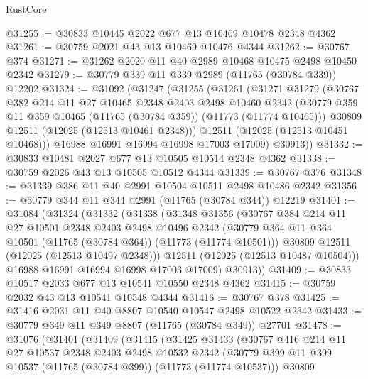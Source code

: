 \begin{lexlean}{RustCore}
\begin{coremodule}
@31255 := @30833 @10445 @2022 @677 @13 @10469 @10478 @2348 @4362
@31261 := @30759 @2021 @43 @13 @10469 @10476 @4344
@31262 := @30767 @374
@31271 := @31262 @2020 @11 @40 @2989 @10468 @10475 @2498 @10450 @2342
@31279 := @30779 @339 @11 @339 @2989 (@11765 (@30784 @339)) @12202
@31324 := @31092
    (@31247
      (@31255
        (@31261
          (@31271
            @31279
            (@30767
              @382
              @214
              @11
              @27
              @10465
              @2348
              @2403
              @2498
              @10460
              @2342
              (@30779 @359 @11 @359 @10465 (@11765 (@30784 @359)) (@11773 (@11774 @10465)))
              @30809
              @12511
              (@12025 (@12513 @10461 @2348)))
            @12511
            (@12025 (@12513 @10451 @10468)))
          @16988
          @16991
          @16994
          @16998
          @17003
          @17009)
        @30913))
@31332 := @30833 @10481 @2027 @677 @13 @10505 @10514 @2348 @4362
@31338 := @30759 @2026 @43 @13 @10505 @10512 @4344
@31339 := @30767 @376
@31348 := @31339 @386 @11 @40 @2991 @10504 @10511 @2498 @10486 @2342
@31356 := @30779 @344 @11 @344 @2991 (@11765 (@30784 @344)) @12219
@31401 := @31084
    (@31324
      (@31332
        (@31338
          (@31348
            @31356
            (@30767
              @384
              @214
              @11
              @27
              @10501
              @2348
              @2403
              @2498
              @10496
              @2342
              (@30779 @364 @11 @364 @10501 (@11765 (@30784 @364)) (@11773 (@11774 @10501)))
              @30809
              @12511
              (@12025 (@12513 @10497 @2348)))
            @12511
            (@12025 (@12513 @10487 @10504)))
          @16988
          @16991
          @16994
          @16998
          @17003
          @17009)
        @30913))
@31409 := @30833 @10517 @2033 @677 @13 @10541 @10550 @2348 @4362
@31415 := @30759 @2032 @43 @13 @10541 @10548 @4344
@31416 := @30767 @378
@31425 := @31416 @2031 @11 @40 @8807 @10540 @10547 @2498 @10522 @2342
@31433 := @30779 @349 @11 @349 @8807 (@11765 (@30784 @349)) @27701
@31478 := @31076
    (@31401
      (@31409
        (@31415
          (@31425
            @31433
            (@30767
              @416
              @214
              @11
              @27
              @10537
              @2348
              @2403
              @2498
              @10532
              @2342
              (@30779 @399 @11 @399 @10537 (@11765 (@30784 @399)) (@11773 (@11774 @10537)))
              @30809

\end{coremodule}
\end{lexlean}
